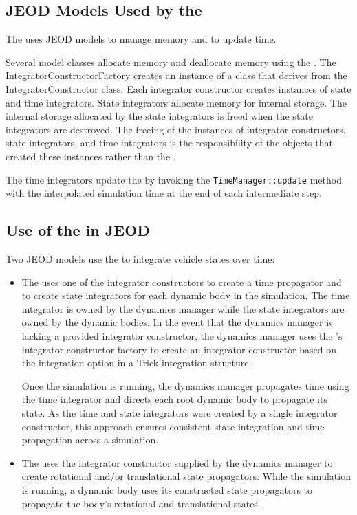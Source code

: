 
\subsection{JEOD Models Used by the \ModelDesc}
The \ModelDesc uses JEOD models to manage memory and to update time.

Several model classes allocate memory and deallocate
memory using the .
The IntegratorConstructorFactory creates an instance of a class
that derives from the IntegratorConstructor class.
Each integrator constructor creates instances of state and time integrators.
State integrators allocate memory for internal storage.
The internal storage allocated by the state integrators is freed
when the state integrators are destroyed. The freeing of the instances
of integrator constructors, state integrators, and time integrators
is the responsibility of the objects that created these instances
rather than the \ModelDesc.

The time integrators update the 
by invoking the \verb+TimeManager::update+ method with the interpolated
simulation time at the end of each intermediate step.

\subsection{Use of the \ModelDesc in JEOD}
Two JEOD models use the \ModelDesc to integrate vehicle states over time:
\begin{itemize}
\item The 
uses one of the \ModelDesc integrator constructors to create a time propagator
and to create state integrators for each dynamic body in the simulation.
The time integrator is owned by the dynamics manager while the
state integrators are owned by the dynamic bodies.
In the event that the dynamics manager is lacking a provided integrator 
constructor, the dynamics manager uses the
\ModelDesc's integrator constructor factory to create an integrator constructor
based on the integration option in a Trick integration structure.

Once the simulation is running, the dynamics manager propagates time using
the time integrator and directs each root dynamic body to propagate its state.
As the time and state integrators were created by a single integrator
constructor, this approach ensures consistent state integration
and time propagation across a simulation.
\item The 
uses the integrator constructor supplied by the dynamics manager to create rotational and/or translational state propagators. While the simulation is
running, a dynamic body uses its constructed state propagators to propagate
the body's rotational and translational states.
\end{itemize}


